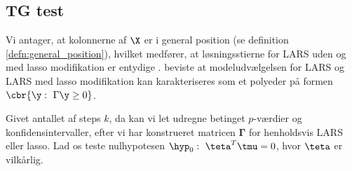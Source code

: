 
\subsection{TG test}
Vi antager, at kolonnerne af \(\X\) er i general position (se definition \ref{defn:general_position}), hvilket medfører, at løsningsstierne for LARS uden og med lasso modifikation er entydige \citep{lasso_unique}. 
\citep{post_inference} beviste at modeludvælgelsen for LARS og LARS med lasso modifikation kan karakteriseres som et polyeder på formen \(\cbr{\y : \ \Gamma \y \geq 0}\).

Givet antallet af steps \(k\), da kan vi let udregne betinget \(p\)-værdier og konfidensintervaller, efter vi har konstrueret matricen \(\boldsymbol{\Gamma}\) for henholdsvis LARS eller lasso.
Lad os teste nulhypotesen \(\hyp_0: \ \teta^T \tmu = 0\), hvor \(\teta\) er vilkårlig.

